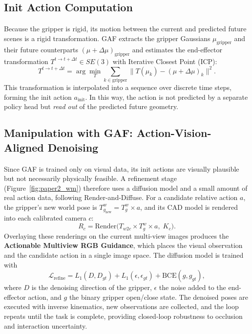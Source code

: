 \documentclass[12pt,a4paper,final]{extreport}
\begin{document}
\subsection{Init Action Computation}

\paragraph{} Because the gripper is rigid, its motion between the current and predicted future scenes is a rigid transformation. GAF extracts the gripper Gaussians $\mu_{\mathrm{gripper}}$ and their future counterparts $(\mu+\Delta\mu)_{\mathrm{gripper}}$ and estimates the end-effector transformation $T^{t\to t+\Delta t}\in SE(3)$ with Iterative Closest Point (ICP):
\begin{equation}
T^{t\to t+\Delta t}=\arg\min_{T}\sum_{k\in\mathrm{gripper}}\big\|T(\mu_k)-(\mu+\Delta\mu)_k\big\|^2 .
\end{equation}
This transformation is interpolated into a sequence over discrete time steps, forming the init action $a_{\mathrm{init}}$. In this way, the action is not predicted by a separate policy head but \emph{read out} of the predicted future geometry.

\subsection{Manipulation with GAF: Action-Vision-Aligned Denoising}

\paragraph{} Since GAF is trained only on visual data, its init actions are visually plausible but not necessarily physically feasible. A refinement stage (Figure~\ref{fig:paper2_wm}) therefore uses a diffusion model and a small amount of real action data, following Render-and-Diffuse. For a candidate relative action $a$, the gripper's new world pose is $T^{w}_{g_{\mathrm{new}}}=T^{w}_{g}\times a$, and its CAD model is rendered into each calibrated camera $c$:
\begin{equation}
R_c=\mathrm{Render}\big(T_{w2c}\times T^{w}_{g}\times a,\;K_c\big).
\end{equation}
Overlaying these renderings on the current multi-view images produces the \textbf{Actionable Multiview RGB Guidance}, which places the visual observation and the candidate action in a single image space. The diffusion model is trained with
\begin{equation}
\mathcal{L}_{\mathrm{refine}}=L_1(D,D_{gt})+L_1(\epsilon,\epsilon_{gt})+\mathrm{BCE}(g,g_{gt}),
\end{equation}
where $D$ is the denoising direction of the gripper, $\epsilon$ the noise added to the end-effector action, and $g$ the binary gripper open/close state. The denoised poses are executed with inverse kinematics, new observations are collected, and the loop repeats until the task is complete, providing closed-loop robustness to occlusion and interaction uncertainty.
\end{document}
